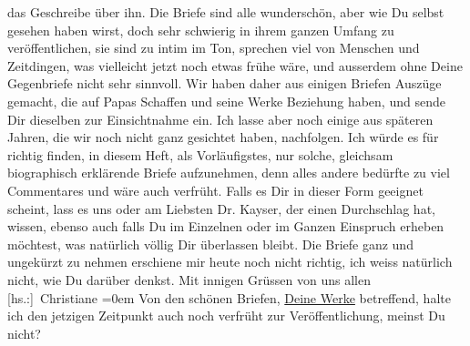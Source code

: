 \begin{ledgroupsized}[t]{13cm}
               das Geschreibe über ihn.\pend
           \pstart
           Die Briefe sind alle wunderschön, aber wie Du selbst gesehen haben wirst, doch sehr
               schwierig in ihrem ganzen Umfang zu veröffentlichen, sie sind zu intim im Ton,
               sprechen viel von Menschen und Zeitdingen, was vielleicht jetzt noch etwas frühe
               wäre, und ausserdem ohne Deine Gegenbriefe nicht sehr sinnvoll.\pend
           \pstart
           Wir haben daher aus einigen Briefen Auszüge gemacht, die auf Papas Schaffen und seine Werke Beziehung
               haben, und sende Dir dieselben zur Einsichtnahme ein. Ich lasse aber noch einige aus
               späteren Jahren, die wir noch nicht ganz gesichtet haben, nachfolgen. Ich würde es
               für richtig finden, in diesem Heft, als Vorläufigstes, nur solche, gleichsam
               biographisch erklärende Briefe aufzunehmen, denn alles andere bedürfte zu viel
               Commentares und wäre auch verfrüht.\pend
           \pstart
           Falls es Dir in dieser Form geeignet scheint, lass es uns oder am Liebsten Dr. Kayser, der einen Durchschlag hat, wissen,
               ebenso auch falls Du im Einzelnen oder im Ganzen Einspruch erheben möchtest, was
               natürlich völlig Dir überlassen bleibt. Die Briefe ganz und ungekürzt zu nehmen
               erschiene mir heute noch nicht richtig, ich weiss natürlich nicht, wie Du darüber
               denkst.\pend
           \pstart
           Mit innigen Grüssen von uns allen{\\[\baselineskip]}\spacefill\mbox{{[}hs.:{]} Christiane}\pend
           \leftskip=0em{}\pstart
           \noindent{}{\pb}Von den schönen Briefen, \uline{Deine Werke} betreffend, halte ich den jetzigen
                  Zeitpunkt auch noch verfrüht zur Veröffentlichung, meinst Du nicht?\pend
           
         
         \endnumbering{}\end{ledgroupsized}  \newcommand{\dateiname}{L02522}\newcommand{\titel}{Christiane von Hofmannsthal an Arthur Schnitzler, 3. 9. 1929}\newcommand{\editorInnen}{Martin Anton Müller und Gerd-Hermann Susen}
      